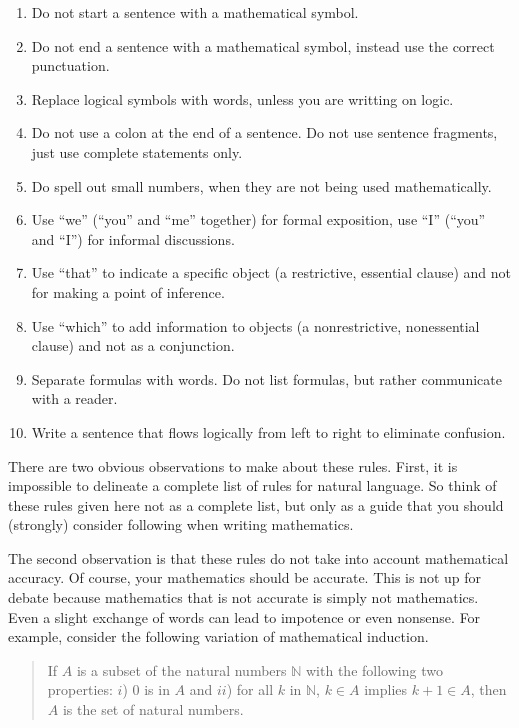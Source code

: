 \documentclass[
  twoside,
  12pt,
  letterpaper,
  fleqn]{article}
\providecommand{\tightlist}{%
  \setlength{\itemsep}{0pt}\setlength{\parskip}{0pt}}\usepackage{longtable,booktabs,array}
\begin{document}
\begin{enumerate}
\def\labelenumi{\arabic{enumi}.}
\tightlist
\item
  Do not start a sentence with a mathematical symbol.
\item
  Do not end a sentence with a mathematical symbol, instead use the
  correct punctuation.
\item
  Replace logical symbols with words, unless you are writting on logic.
\item
  Do not use a colon at the end of a sentence. Do not use sentence
  fragments, just use complete statements only.
\item
  Do spell out small numbers, when they are not being used
  mathematically.
\item
  Use ``we'' (``you'' and ``me'' together) for formal exposition, use
  ``I'' (``you'' and ``I'') for informal discussions.
\item
  Use ``that'' to indicate a specific object (a restrictive, essential
  clause) and not for making a point of inference.
\item
  Use ``which'' to add information to objects (a nonrestrictive,
  nonessential clause) and not as a conjunction.
\item
  Separate formulas with words. Do not list formulas, but rather
  communicate with a reader.
\item
  Write a sentence that flows logically from left to right to eliminate
  confusion.
\end{enumerate}

There are two obvious observations to make about these rules. First, it
is impossible to delineate a complete list of rules for natural
language. So think of these rules given here not as a complete list, but
only as a guide that you should (strongly) consider following when
writing mathematics.

The second observation is that these rules do not take into account
mathematical accuracy. Of course, your mathematics should be accurate.
This is not up for debate because mathematics that is not accurate is
simply not mathematics. Even a slight exchange of words can lead to
impotence or even nonsense. For example, consider the following
variation of mathematical induction.

\begin{quote}
If \(A\) is a subset of the natural numbers \(\mathbb{N}\) with the
following two properties: \(i\)) 0 is in \(A\) and \(ii\)) for all \(k\)
in \(\mathbb{N}\), \(k\in A\) implies \(k+1\in A\), then \(A\) is the
set of natural numbers.
\end{quote}
\end{document}
